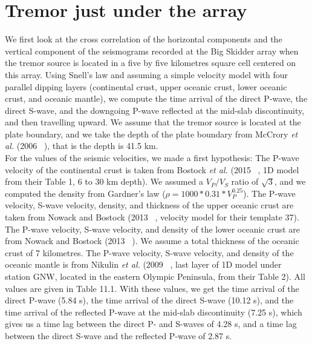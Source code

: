 \documentclass[workdone.tex]{subfiles}
\begin{document}
\section{Tremor just under the array}

We first look at the cross correlation of the horizontal components and the vertical component of the seismograms recorded at the Big Skidder array when the tremor source is located in a five by five kilometres square cell centered on this array. Using Snell's law and assuming a simple velocity model with four parallel dipping layers (continental crust, upper oceanic crust, lower oceanic crust, and oceanic mantle), we compute the time arrival of the direct P-wave, the direct S-wave, and the downgoing P-wave reflected at the mid-slab discontinuity, and then travelling upward. We assume that the tremor source is located at the plate boundary, and we take the depth of the plate boundary from McCrory \textit{et al.} (2006 ~\cite{MCC_2006}), that is the depth is 41.5 km. \\

For the values of the seismic velocities, we made a first hypothesis: The P-wave velocity of the continental crust is taken from Bostock \textit{et al.} (2015 ~\cite{BOS_2015}, 1D model from their Table 1, 6 to 30 km depth). We assumed a $V_P / V_S$ ratio of $\sqrt{3}$, and we computed the density from Gardner's law ($\rho = 1000 * 0.31 * V_P^{0.25}$). The P-wave velocity, S-wave velocity, density, and thickness of the upper oceanic crust are taken from Nowack and Bostock (2013 ~\cite{NOW_2013}, velocity model for their template 37). The P-wave velocity, S-wave velocity, and density of the lower oceanic crust are from Nowack and Bostock (2013 ~\cite{NOW_2013}). We assume a total thickness of the oceanic crust of 7 kilometres. The P-wave velocity, S-wave velocity, and density of the oceanic mantle is from Nikulin \textit{et al.} (2009 ~\cite{NIK_2009}, last layer of 1D model under station GNW, located in the eastern Olympic Peninsula, from their Table 2). All values are given in Table 11.1. With these values, we get the time arrival of the direct P-wave (5.84 s), the time arrival of the direct S-wave (10.12 s), and the time arrival of the reflected P-wave at the mid-slab discontinuity (7.25 s), which gives us a time lag between the direct P- and S-waves of 4.28 s, and a time lag between the direct S-wave and the reflected P-wave of 2.87 s. \\
\end{document}

